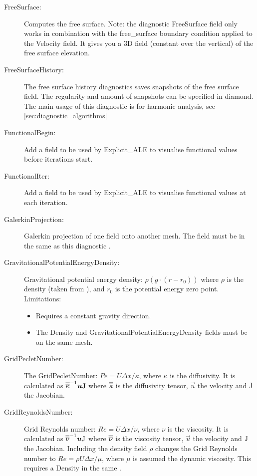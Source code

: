 \begin{description}
\item[FreeSurface:]Computes the free surface. Note: the diagnostic FreeSurface field only works in combination with the free\_surface boundary condition applied to the Velocity field. It gives you a 3D field (constant over the vertical) of the free surface elevation.
\item[FreeSurfaceHistory:]The free surface history diagnostics saves snapshots of the free surface field. The regularity and amount of snapshots can be specified in diamond. The main usage of this diagnostic is for harmonic analysis, see \ref{sec:diagnostic_algorithms}
\item[FunctionalBegin:]Add a field to be used by Explicit\_ALE to visualise functional values before iterations start.  
\item[FunctionalIter:]Add a field to be used by Explicit\_ALE to visualise functional values at each iteration.
\item[GalerkinProjection:]Galerkin projection of one field onto another mesh. The field must be in the same  as this diagnostic .
\item[GravitationalPotentialEnergyDensity:]Gravitational potential energy density: $\rho(g \cdot (r - r_0))$ where $\rho$ is the density (taken from ), and $r_0$ is the potential energy zero point. \\
	Limitations: \begin{itemize}
	\item Requires a constant gravity direction. 
	\item The Density and GravitationalPotentialEnergyDensity fields must be on the same mesh. 
	\end{itemize}
\item[GridPecletNumber:]The GridPecletNumber: $Pe = U\Delta x/\kappa$, where $\kappa$ is the diffusivity. It is calculated as $\overline{\overline{\kappa}}^{-1}{\mbox{\boldmath$u$}}\mathrm{J}$ where $\overline{\overline{\kappa}}$ is the diffusivity tensor, $\vec{u}$ the velocity and $\mathrm{J}$ the Jacobian.
\item[GridReynoldsNumber:]Grid Reynolds number: $Re = U\Delta x/\nu$, where $\nu$ is the viscosity. It is calculated as $\overline{\overline{\nu}}^{-1}{\mbox{\boldmath$u$}}\mathrm{J}$ where $\overline{\overline{\nu}}$ is the viscosity tensor, $\vec{u}$ the velocity and $\mathrm{J}$ the Jacobian. Including the density field $\rho$ changes the Grid Reynolds number to $Re = \rho U\Delta x/\mu$, where $\mu$ is assumed the dynamic viscosity. This requires a Density  in the same .

\end{description}
